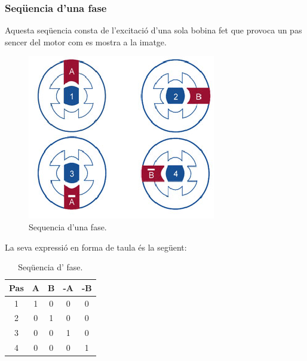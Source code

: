 \subsubsection{Seqüencia d'una fase}
Aquesta seqüencia consta de l'excitació d'una sola bobina fet que provoca un pas sencer del motor com es mostra a la imatge.  
\begin{figure}[H]
	\centering
	\includegraphics[scale=1.2]{Sequencia_1_fase.eps}
	\caption{Sequencia d'una fase.}
	\label{fig:1fase}
\end{figure}
La seva expressió en forma de taula és la següent:
\begin{table}[H]
	\begin{center}
		\begin{tabular}{|c||c|c|c|c|}
			\hline
			Pas & A & B & -A & -B \\
			\hline \hline
			1 & 1 & 0 & 0 & 0 \\ \hline
			2 & 0 & 1 & 0 & 0 \\ \hline
			3 & 0 & 0 & 1 & 0 \\ \hline
			4 & 0 & 0 & 0 & 1 \\ \hline
		\end{tabular}
		\caption{Seqüencia d' fase.}
		\label{tabla:1fase}
	\end{center}
\end{table}

